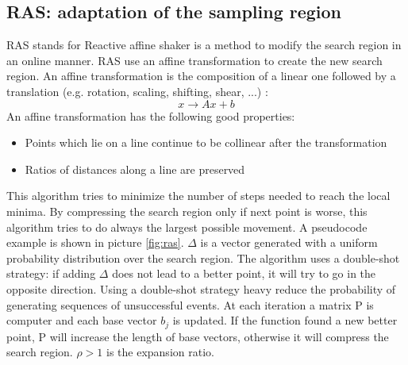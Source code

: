 \documentclass[10pt]{article}
\begin{document}
\subsection{RAS: adaptation of the sampling region}
RAS stands for Reactive affine shaker is a method to modify the search region in an online manner. RAS use an affine transformation to 
create the new search region. An affine transformation is the composition of a linear one followed by a translation (e.g. rotation, scaling, shifting, shear, ...) :
$$
x \rightarrow Ax + b
$$
An affine transformation has the following good properties:
\begin{itemize}
\item{Points which lie on a line continue to be collinear after the transformation}
\item{Ratios of distances along a line are preserved}
\end{itemize}

This algorithm tries to minimize the number of steps needed to reach the local minima. By compressing the search region only if next point is worse, this algorithm tries to do always the largest possible movement. A pseudocode example is shown in picture \ref{fig:ras}. $\Delta$ is a vector generated with a uniform probability distribution over the search region. The algorithm uses a double-shot strategy: if adding $\Delta$ does not lead to a better point, it will try to go in the opposite direction. Using a double-shot strategy heavy reduce the probability of generating sequences of unsuccessful events. At each iteration a matrix P is computer and each base vector $b_j$ is updated.
If the function found a new better point, P will increase the length of base vectors, otherwise it will compress the search region. $\rho > 1$ is the expansion ratio. 
\end{document}
